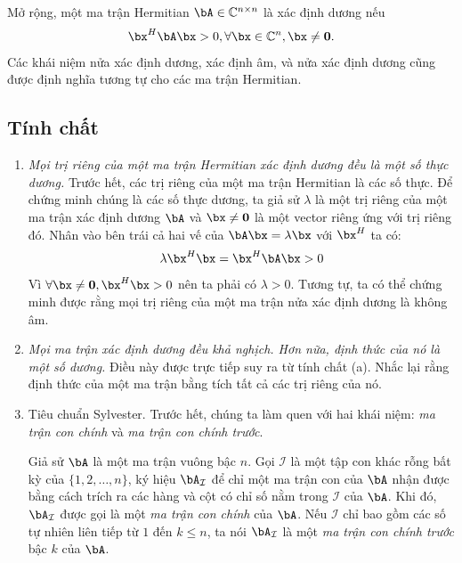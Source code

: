 Mở rộng, một ma trận Hermitian $\bA \in \mathbb{C}^{n\times n}$ là xác định dương nếu
\begin{equation}
    \bx^H\bA\bx > 0, \forall \bx \in \mathbb{C}^{n}, \bx \neq \mathbf{0}.
\end{equation}
Các khái niệm nửa xác định dương, xác định âm, và nửa xác định dương cũng được
định nghĩa tương tự cho các ma trận Hermitian.
\subsection{Tính chất} %
\label{sub:tinh_chat}
\begin{enumerate}

    \item \textit{Mọi trị riêng của một ma trận Hermitian xác định dương đều là một số
    thực dương.}  Trước hết, các trị riêng của một ma trận Hermitian là các số
    thực. Để chứng minh chúng là các số thực dương, ta giả sử $\lambda$ là một
    trị riêng của một ma trận xác định dương $\bA$ và $\bx \neq \mathbf{0}$ là
    một vector riêng ứng với trị riêng đó. Nhân vào bên trái cả hai vế của
    $\bA\bx = \lambda \bx$ với $\bx^H$ ta có:
    \begin{equation}
        \lambda \bx^H \bx = \bx^H \bA \bx > 0
    \end{equation}
    Vì $\forall \bx \neq \mathbf{0}, \bx^H\bx > 0$ nên ta phải có $\lambda > 0$. Tương
    tự, ta có thể chứng minh được rằng mọi trị riêng của một ma trận
    nửa xác định dương là không âm.


    \item \textit{Mọi ma trận xác định dương đều khả nghịch. Hơn nữa, định thức
    của nó là một số dương.}  Điều này được trực tiếp suy ra từ tính chất (a).
    Nhắc lại rằng định thức của một ma trận bằng tích tất cả các trị riêng của
    nó.


    \def\AI{\bA_{\mathcal{I}}}
    \item Tiêu chuẩn Sylvester. Trước hết, chúng ta làm quen với hai khái niệm:
    \textit{ma trận con chính} và \textit{ma trận con chính trước}.
    
    Giả sử $\bA$ là một ma trận vuông bậc $n$. Gọi $\mathcal{I}$ là một tập con
    khác rỗng bất kỳ của $\{1, 2, \dots, n\}$, ký hiệu $\AI$ để chỉ một ma trận
    con của $\bA$ nhận được bằng cách trích ra các hàng và cột có chỉ số nằm
    trong $\mathcal{I}$ của $\bA$. Khi đó, $\AI$ được gọi là một \textit{ma trận
    con chính} của $\bA$. Nếu $\mathcal{I}$ chỉ bao gồm các số tự nhiên liên
    tiếp từ $1$ đến $k \leq  n$, ta nói $\AI$ là một \textit{ma trận con chính
    trước} bậc $k$ của $\bA$.


\end{enumerate}
